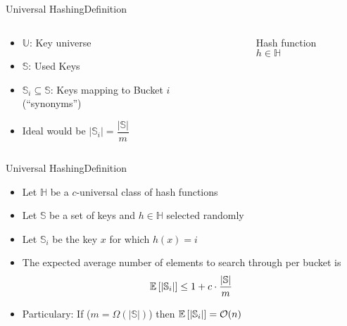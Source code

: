 \begin{frame}{Universal Hashing}{Definition}
  \begin{columns}
    \begin{column}{0.5\linewidth}
      \begin{itemize}
        \item
          {\color{Mittel-Blau}$\mathbb{U}$}:
          Key universe
        \item
          {\color{Mittel-Blau}$\mathbb{S}$}:
          Used Keys
        \item
          {\color{Mittel-Blau}$\mathbb{S}_i \subseteq \mathbb{S}$}:
          Keys mapping to Bucket {\color{Mittel-Blau}$i$} (\enquote{synonyms})
       \item
         Ideal would be
         {\color{Mittel-Blau}$\vert \mathbb{S}_i \vert =\dfrac{\vert \mathbb{S} \vert}{m}$}
      \end{itemize}
    \end{column}
    \begin{column}{0.5\linewidth}
      \begin{figure}[!h]%
        \begin{adjustbox}{width=\linewidth}%
        \end{adjustbox}\vspace*{-2em}
        \caption{Hash function {\color{Mittel-Blau}$h \in \mathbb{H}$}}%
        \label{fig:universal_hashing:hash_function_to_bucket}
      \end{figure}
    \end{column}
  \end{columns}
\end{frame}


\begin{frame}{Universal Hashing}{Definition}
  \begin{itemize}
    \item<1->
      Let {\color{Mittel-Blau}$\mathbb{H}$} be a {\color{Mittel-Blau}$c$}-universal class of hash functions
    \item<2->
      Let {\color{Mittel-Blau}$\mathbb{S}$} be a set of keys and {\color{Mittel-Blau}$h \in \mathbb{H}$} selected randomly
    \item<3->
      Let {\color{Mittel-Blau}$\mathbb{S}_i$} be the key {\color{Mittel-Blau}$x$} for which {\color{Mittel-Blau}$h(x) = i$}
    \item<4->
      The expected average number of elements to search through per 
      bucket is {\color{Mittel-Blau}\[\mathbb{E}{}\left[\vert \mathbb{S}_i \vert\right]
        \leq 1 + c \cdot \frac{\vert \mathbb{S} \vert}{m}\]}
    \item<5->
      Particulary: If  {\color{Mittel-Blau}($m = \Omega(\vert \mathbb{S} \vert)$)} then
      {\color{Mittel-Blau}$\mathbb{E}{}\left[\vert \mathbb{S}_i \vert\right] = \mathcal{O}(n)$}
  \end{itemize}
\end{frame}
